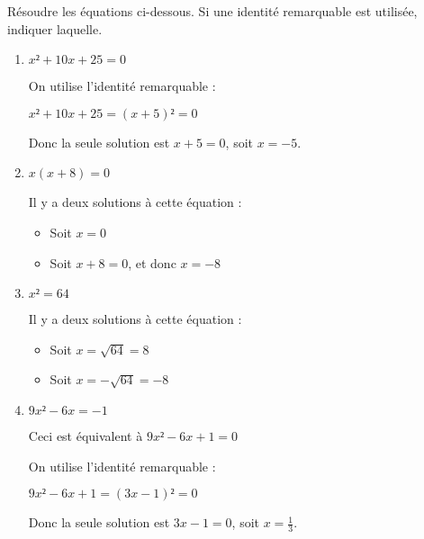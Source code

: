 \documentclass[
	classe=$2^{de}$,
]{évaluation}
\begin{document}
\begin{exercice}[4]
	Résoudre les équations ci-dessous. Si une identité remarquable est utilisée, indiquer laquelle.
	\begin{enumerate}
		\item $x² + 10x + 25 = 0$

		      {\color{red} On utilise l'identité remarquable  :

				      $x² + 10x + 25 = (x + 5)² = 0$

				      Donc la seule solution est $x + 5 = 0$, soit $x = -5$.}
		\item $x(x + 8) = 0$

		      {\color{red}Il y a deux solutions à cette équation :
				      \begin{itemize}
					      \item Soit $x = 0$
					      \item Soit $x + 8 = 0$, et donc $x = -8$
				      \end{itemize}}
		\item $x² = 64$

		      {\color{red}Il y a deux solutions à cette équation :
				      \begin{itemize}
					      \item Soit $x = \sqrt{64} = 8$
					      \item Soit $x = -\sqrt{64} = -8$
				      \end{itemize}}
		\item $9x² - 6x = -1$

		      {\color{red}Ceci est équivalent à $9x² - 6x + 1 = 0$

				      On utilise l'identité remarquable  :

				      $9x² - 6x + 1 = (3x - 1)² = 0$

				      Donc la seule solution est $3x - 1 = 0$, soit $x = \frac{1}{3}$.}
	\end{enumerate}
\end{exercice}
\end{document}

